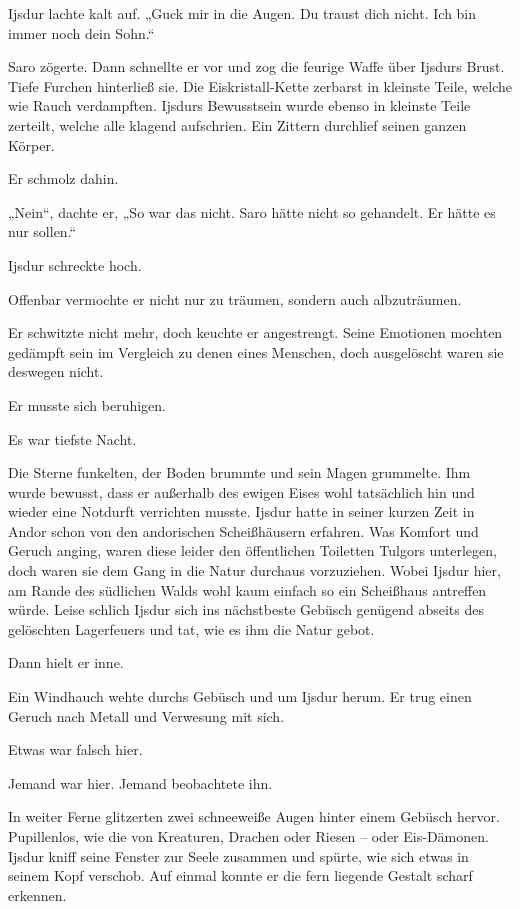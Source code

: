 Ijsdur lachte kalt auf. „Guck mir in die Augen. Du traust dich nicht. Ich bin immer noch dein Sohn.“

Saro zögerte. Dann schnellte er vor und zog die feurige Waffe über Ijsdurs Brust. Tiefe Furchen hinterließ sie. Die Eiskristall-Kette zerbarst in kleinste Teile, welche wie Rauch verdampften. Ijsdurs Bewusstsein wurde ebenso in kleinste Teile zerteilt, welche alle klagend aufschrien. Ein Zittern durchlief seinen ganzen Körper.

Er schmolz dahin.



„Nein“, dachte er, „So war das nicht. Saro hätte nicht so gehandelt. Er hätte es nur sollen.“



\trennzeichen



Ijsdur schreckte hoch.

Offenbar vermochte er nicht nur zu träumen, sondern auch albzuträumen.

Er schwitzte nicht mehr, doch keuchte er angestrengt. Seine Emotionen mochten gedämpft sein im Vergleich zu denen eines Menschen, doch ausgelöscht waren sie deswegen nicht.

Er musste sich beruhigen.

Es war tiefste Nacht.

Die Sterne funkelten, der Boden brummte und sein Magen grummelte. Ihm wurde bewusst, dass er außerhalb des ewigen Eises wohl tatsächlich hin und wieder eine Notdurft verrichten musste. Ijsdur hatte in seiner kurzen Zeit in Andor schon von den andorischen Scheißhäusern erfahren. Was Komfort und Geruch anging, waren diese leider den öffentlichen Toiletten Tulgors unterlegen, doch waren sie dem Gang in die Natur durchaus vorzuziehen. Wobei Ijsdur hier, am Rande des südlichen Walds wohl kaum einfach so ein Scheißhaus antreffen würde. Leise schlich Ijsdur sich ins nächstbeste Gebüsch genügend abseits des gelöschten Lagerfeuers und tat, wie es ihm die Natur gebot.

Dann hielt er inne.

Ein Windhauch wehte durchs Gebüsch und um Ijsdur herum. Er trug einen Geruch nach Metall und Verwesung mit sich.

Etwas war falsch hier.

Jemand war hier. Jemand beobachtete ihn.

In weiter Ferne glitzerten zwei schneeweiße Augen hinter einem Gebüsch hervor. Pupillenlos, wie die von Kreaturen, Drachen oder Riesen – oder Eis-Dämonen. Ijsdur kniff seine Fenster zur Seele zusammen und spürte, wie sich etwas in seinem Kopf verschob. Auf einmal konnte er die fern liegende Gestalt scharf erkennen.

